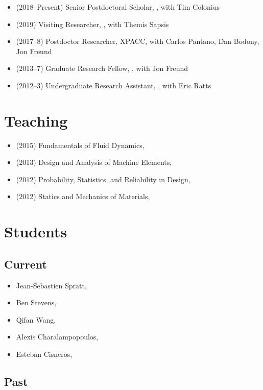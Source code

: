 \begin{itemize}
    \item (2018--Present) Senior Postdoctoral Scholar, \CIT, with Tim Colonius
    \item (2019) Visiting Researcher, \MIT, with Themis Sapsis
    \item (2017--8) Postdoctor Researcher, XPACC, with Carlos Pantano, Dan Bodony, Jon Freund
    \item (2013--7) Graduate Research Fellow, \UIUC, with Jon Freund
    \item (2012--3) Undergraduate Research Assistant, \UMD, with Eric Ratts
\end{itemize}

\section{Teaching}

\begin{itemize}
    \item (2015) Fundamentals of Fluid Dynamics, \UIUC
    \item (2013) Design and Analysis of Machine Elements, \UMD
    \item (2012) Probability, Statistics, and Reliability in Design, \UMD
    \item (2012) Statics and Mechanics of Materials, \UMD
\end{itemize}


\section{Students}

\subsection{Current}

\begin{itemize}
    \item Jean-Sebastien Spratt, \CIT
    \item Ben Stevens, \CIT
    \item Qifan Wang, \CIT
    \item Alexis Charalampopoulos, \MIT
    \item Esteban Cisneros, \UIUC
\end{itemize}

\subsection{Past}

